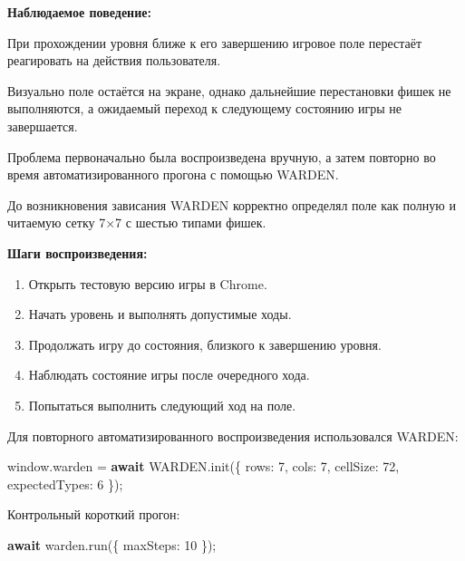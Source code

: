 \documentclass{ZGJournalArticle_2026}
\providecommand{\tightlist}{%
  \setlength{\itemsep}{0pt}\setlength{\parskip}{0pt}}
\newenvironment{Shaded}{}{}
\newcommand{\AttributeTok}[1]{\textcolor[rgb]{0.49,0.56,0.16}{#1}}
\newcommand{\BuiltInTok}[1]{\textcolor[rgb]{0.00,0.50,0.00}{#1}}
\newcommand{\ControlFlowTok}[1]{\textcolor[rgb]{0.00,0.44,0.13}{\textbf{#1}}}
\newcommand{\DataTypeTok}[1]{\textcolor[rgb]{0.56,0.13,0.00}{#1}}
\newcommand{\DecValTok}[1]{\textcolor[rgb]{0.25,0.63,0.44}{#1}}
\newcommand{\FunctionTok}[1]{\textcolor[rgb]{0.02,0.16,0.49}{#1}}
\newcommand{\NormalTok}[1]{#1}
\newcommand{\OperatorTok}[1]{\textcolor[rgb]{0.40,0.40,0.40}{#1}}
\begin{document}
\textbf{Наблюдаемое поведение:}

При прохождении уровня ближе к его завершению игровое поле перестаёт
реагировать на действия пользователя.

Визуально поле остаётся на экране, однако дальнейшие перестановки фишек
не выполняются, а ожидаемый переход к следующему состоянию игры не
завершается.

Проблема первоначально была воспроизведена вручную, а затем повторно во
время автоматизированного прогона с помощью WARDEN.

До возникновения зависания WARDEN корректно определял поле как полную и
читаемую сетку 7×7 с шестью типами фишек.

\textbf{Шаги воспроизведения:}

\begin{enumerate}
\def\labelenumi{\arabic{enumi}.}
\tightlist
\item
  Открыть тестовую версию игры в Chrome.
\item
  Начать уровень и выполнять допустимые ходы.
\item
  Продолжать игру до состояния, близкого к завершению уровня.
\item
  Наблюдать состояние игры после очередного хода.
\item
  Попытаться выполнить следующий ход на поле.
\end{enumerate}

\newpage

Для повторного автоматизированного воспроизведения использовался WARDEN:

\begin{Shaded}
\begin{Highlighting}[]
\BuiltInTok{window}\OperatorTok{.}\AttributeTok{warden} \OperatorTok{=} \ControlFlowTok{await}\NormalTok{ WARDEN}\OperatorTok{.}\FunctionTok{init}\NormalTok{(\{}
  \DataTypeTok{rows}\OperatorTok{:} \DecValTok{7}\OperatorTok{,}
  \DataTypeTok{cols}\OperatorTok{:} \DecValTok{7}\OperatorTok{,}
  \DataTypeTok{cellSize}\OperatorTok{:} \DecValTok{72}\OperatorTok{,}
  \DataTypeTok{expectedTypes}\OperatorTok{:} \DecValTok{6}
\NormalTok{\})}\OperatorTok{;}
\end{Highlighting}
\end{Shaded}

Контрольный короткий прогон:

\begin{Shaded}
\begin{Highlighting}[]
\ControlFlowTok{await}\NormalTok{ warden}\OperatorTok{.}\FunctionTok{run}\NormalTok{(\{ }\DataTypeTok{maxSteps}\OperatorTok{:} \DecValTok{10}\NormalTok{ \})}\OperatorTok{;}
\end{Highlighting}
\end{Shaded}
\end{document}
